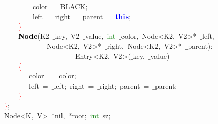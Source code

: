 \documentclass[table, usenames,dvipsnames,svgnames]{beamer}
\begin{document}
\begin{frame}
\begin{center}
\begin{minipage}{90mm}
\begin{block}
\mbox{}\ \ \ \ \ \ \ \ \ \ \ \ color\ \textcolor{BrickRed}{=}\ BLACK\textcolor{BrickRed}{;} \\
\mbox{}\ \ \ \ \ \ \ \ \ \ \ \ left\ \textcolor{BrickRed}{=}\ right\ \textcolor{BrickRed}{=}\ parent\ \textcolor{BrickRed}{=}\ \textbf{\textcolor{Blue}{this}}\textcolor{BrickRed}{;} \\
\mbox{}\ \ \ \ \ \ \ \ \textcolor{Red}{\}} \\
\mbox{}\ \ \ \ \ \ \ \ \textbf{\textcolor{Black}{Node}}\textcolor{BrickRed}{(}\textcolor{TealBlue}{K2}\ $\_$key\textcolor{BrickRed}{,}\ \textcolor{TealBlue}{V2}\ $\_$value\textcolor{BrickRed}{,}\ \textcolor{ForestGreen}{int}\ $\_$color\textcolor{BrickRed}{,}\ Node\textcolor{BrickRed}{\textless{}}K2\textcolor{BrickRed}{,}\ V2\textcolor{BrickRed}{\textgreater{}*}\ $\_$left\textcolor{BrickRed}{,}\  \\
\mbox{}\ \ \ \ \ \ \ \ \ \ \ \ \ \ \ \ Node\textcolor{BrickRed}{\textless{}}K2\textcolor{BrickRed}{,}\ V2\textcolor{BrickRed}{\textgreater{}*}\ $\_$right\textcolor{BrickRed}{,}\ Node\textcolor{BrickRed}{\textless{}}K2\textcolor{BrickRed}{,}\ V2\textcolor{BrickRed}{\textgreater{}*}\ $\_$parent\textcolor{BrickRed}{):}\  \\
\mbox{}\ \ \ \ \ \ \ \ \ \ \ \ \ \ \ \ \ \ \ \ \ \ \ \ Entry\textcolor{BrickRed}{\textless{}}K2\textcolor{BrickRed}{,}\ V2\textcolor{BrickRed}{\textgreater{}(}$\_$key\textcolor{BrickRed}{,}\ $\_$value\textcolor{BrickRed}{)}\  \\
\mbox{}\ \ \ \ \ \ \ \ \textcolor{Red}{\{} \\
\mbox{}\ \ \ \ \ \ \ \ \ \ \ color\ \textcolor{BrickRed}{=}\ $\_$color\textcolor{BrickRed}{;}\  \\
\mbox{}\ \ \ \ \ \ \ \ \ \ \ left\ \textcolor{BrickRed}{=}\ $\_$left\textcolor{BrickRed}{;}\ right\ \textcolor{BrickRed}{=}\ $\_$right\textcolor{BrickRed}{;}\ parent\ \textcolor{BrickRed}{=}\ $\_$parent\textcolor{BrickRed}{;} \\
\mbox{}\ \ \ \ \ \ \ \ \textcolor{Red}{\}} \\
\mbox{}\ \ \ \ \textcolor{Red}{\}}\textcolor{BrickRed}{;} \\
\mbox{}\ \ \ \ \textcolor{TealBlue}{Node\textless{}K,\ V\textgreater{}}\ \textcolor{BrickRed}{*}nil\textcolor{BrickRed}{,}\ \textcolor{BrickRed}{*}root\textcolor{BrickRed}{;}\ \textcolor{ForestGreen}{int}\ sz\textcolor{BrickRed}{;} 
\end{block}
\end{minipage}\end{center}

\end{frame}
\end{document}
